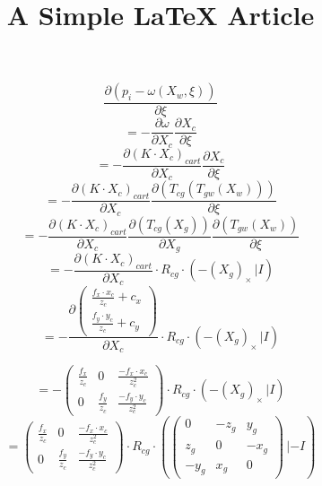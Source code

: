 \documentclass{article}
\begin{document}
\title{A Simple LaTeX Article}
$$ \frac{\partial (p_i-\omega(X_w,\xi))}{\partial  \xi }$$
$$=- \frac{\partial \omega }{\partial X_c }  \frac{\partial X_c }{\partial \xi}$$
$$=- \frac{\partial (K\cdot X_c)_{cart}}{\partial X_c }  \frac{\partial X_c }{\partial \xi}$$
$$=-\frac{\partial (K\cdot X_c)_{cart}}{\partial X_c }\frac{\partial (T_{cg}(T_{gw}( X_w))) }{\partial \xi}$$
$$=-\frac{\partial (K\cdot X_c)_{cart}}{\partial X_c }\frac{\partial (T_{cg}(X_g)) }{\partial X_g}\frac{\partial (T_{gw}( X_w)) }{\partial \xi}$$
$$=-\frac{\partial (K\cdot X_c)_{cart}}{\partial X_c }\cdot R_{cg}\cdot(-(X_g)_\times\,|I )$$
$$=-\frac{\partial \begin{pmatrix}  \frac{f_x \cdot x_c}{z_c}+c_x  \\  \frac{f_y \cdot y_c}{z_c}+c_y   \end{pmatrix}}{\partial X_c }\cdot R_{cg}\cdot(-(X_g)_\times\,|I )$$


$$=
-
\begin{pmatrix}  \frac{f_x}{z_c}&0&\frac{-f_x\cdot x_c}{z_c^2}  \\ 0& \frac{f_y }{z_c}  & \frac{-f_y\cdot y_c}{z_c^2} \end{pmatrix}\cdot R_{cg}\cdot(-(X_g)_\times\,|I )$$
$$=
\begin{pmatrix}  \frac{f_x}{z_c}&0&\frac{-f_x\cdot x_c}{z_c^2}  \\ 0& \frac{f_y }{z_c}  & \frac{-f_y\cdot y_c}{z_c^2} \end{pmatrix}\cdot R_{cg}\cdot(\begin{pmatrix} 0&-z_g&y_g\\z_g&0&-x_g\\-y_g&x_g&0\end{pmatrix}\,|-I )$$
\end{document}
